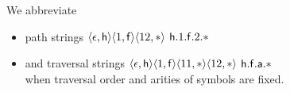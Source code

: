 
\begin{notation}
	We abbreviate
	\begin{itemize}
		\pause
		\item path strings
		$\langle\epsilon,{\mathsf h}\rangle\langle1,{\mathsf f}\rangle\langle12,*\rangle$
		\hfill ${\mathsf h}.1.{\mathsf f}.2.{*}$
		\pause
		\item and traversal strings
		$\langle\epsilon,{\mathsf h}\rangle\langle1,{\mathsf f}\rangle\langle11,*\rangle\langle12,*\rangle$
		\hfill ${\mathsf h}.{\mathsf f}.{\mathsf a}.{*}$
		\pause\\
		when traversal order and arities of symbols are fixed.
	\end{itemize}
\end{notation}